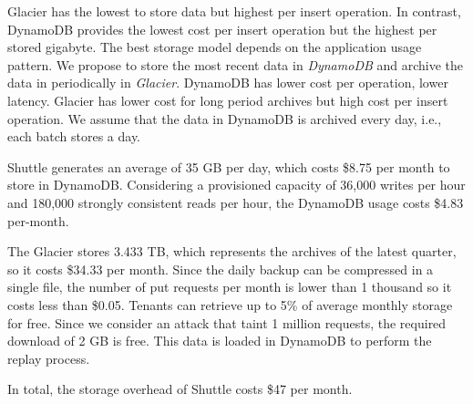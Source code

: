 Glacier has the lowest to store data but highest per insert operation. In contrast, DynamoDB provides the lowest cost per insert operation but the highest per stored gigabyte. The best storage model depends on the application usage pattern. We propose to store the most recent data in \emph{DynamoDB} and archive the data in periodically in \emph{Glacier}. DynamoDB has lower cost per operation, lower latency. Glacier has lower cost for long period archives but high cost per insert operation. We assume that the data in DynamoDB is archived every day, i.e., each batch stores a day.

Shuttle generates an average of 35 GB per day, which costs \$8.75 per month to store in DynamoDB. Considering a provisioned capacity of 36,000 writes per hour and 180,000 strongly consistent reads per hour, the DynamoDB usage costs \$4.83 per-month.

The Glacier stores 3.433 TB, which represents the archives of the latest quarter, so it costs \$34.33 per month. Since the daily backup can be compressed in a single file, the number of put requests per month is lower than 1 thousand so it costs less than \$0.05. Tenants can retrieve up to 5\% of average monthly storage for free. Since we consider an attack that taint 1 million requests, the required download of 2 GB is free. This data is loaded in DynamoDB to perform the replay process. 

In total, the storage overhead of Shuttle costs \$47 per month.




